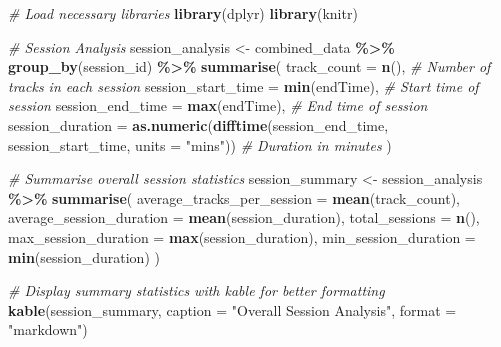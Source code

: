 \documentclass[
]{article}
\newenvironment{Shaded}{\begin{snugshade}}{\end{snugshade}}
\newcommand{\AttributeTok}[1]{\textcolor[rgb]{0.13,0.29,0.53}{#1}}
\newcommand{\CommentTok}[1]{\textcolor[rgb]{0.56,0.35,0.01}{\textit{#1}}}
\newcommand{\FunctionTok}[1]{\textcolor[rgb]{0.13,0.29,0.53}{\textbf{#1}}}
\newcommand{\NormalTok}[1]{#1}
\newcommand{\OtherTok}[1]{\textcolor[rgb]{0.56,0.35,0.01}{#1}}
\newcommand{\SpecialCharTok}[1]{\textcolor[rgb]{0.81,0.36,0.00}{\textbf{#1}}}
\newcommand{\StringTok}[1]{\textcolor[rgb]{0.31,0.60,0.02}{#1}}
\begin{document}
\begin{Shaded}
\begin{Highlighting}[]
\CommentTok{\# Load necessary libraries}
\FunctionTok{library}\NormalTok{(dplyr)}
\FunctionTok{library}\NormalTok{(knitr)}

\CommentTok{\# Session Analysis}
\NormalTok{session\_analysis }\OtherTok{\textless{}{-}}\NormalTok{ combined\_data }\SpecialCharTok{\%\textgreater{}\%}
  \FunctionTok{group\_by}\NormalTok{(session\_id) }\SpecialCharTok{\%\textgreater{}\%}
  \FunctionTok{summarise}\NormalTok{(}
    \AttributeTok{track\_count =} \FunctionTok{n}\NormalTok{(),                               }\CommentTok{\# Number of tracks in each session}
    \AttributeTok{session\_start\_time =} \FunctionTok{min}\NormalTok{(endTime),               }\CommentTok{\# Start time of session}
    \AttributeTok{session\_end\_time =} \FunctionTok{max}\NormalTok{(endTime),                 }\CommentTok{\# End time of session}
    \AttributeTok{session\_duration =} \FunctionTok{as.numeric}\NormalTok{(}\FunctionTok{difftime}\NormalTok{(session\_end\_time, session\_start\_time, }\AttributeTok{units =} \StringTok{"mins"}\NormalTok{))  }\CommentTok{\# Duration in minutes}
\NormalTok{  ) }

\CommentTok{\# Summarise overall session statistics}
\NormalTok{session\_summary }\OtherTok{\textless{}{-}}\NormalTok{ session\_analysis }\SpecialCharTok{\%\textgreater{}\%}
  \FunctionTok{summarise}\NormalTok{(}
    \AttributeTok{average\_tracks\_per\_session =} \FunctionTok{mean}\NormalTok{(track\_count),}
    \AttributeTok{average\_session\_duration =} \FunctionTok{mean}\NormalTok{(session\_duration),}
    \AttributeTok{total\_sessions =} \FunctionTok{n}\NormalTok{(),}
    \AttributeTok{max\_session\_duration =} \FunctionTok{max}\NormalTok{(session\_duration),}
    \AttributeTok{min\_session\_duration =} \FunctionTok{min}\NormalTok{(session\_duration)}
\NormalTok{  )}

\CommentTok{\# Display summary statistics with kable for better formatting}
\FunctionTok{kable}\NormalTok{(session\_summary, }\AttributeTok{caption =} \StringTok{"Overall Session Analysis"}\NormalTok{, }\AttributeTok{format =} \StringTok{"markdown"}\NormalTok{)}
\end{Highlighting}
\end{Shaded}
\end{document}
